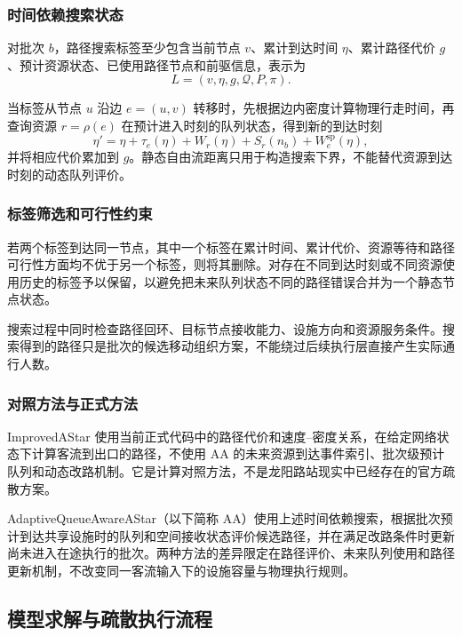 \documentclass[UTF8,a4paper,12pt]{ctexart}
\begin{document}
\subsubsection{时间依赖搜索状态}

对批次 \(b\)，路径搜索标签至少包含当前节点 \(v\)、累计到达时间 \(\eta\)、累计路径代价 \(g\)、预计资源状态、已使用路径节点和前驱信息，表示为
\[
L=(v,\eta,g,\mathcal{Q},P,\pi).
\]

当标签从节点 \(u\) 沿边 \(e=(u,v)\) 转移时，先根据边内密度计算物理行走时间，再查询资源 \(r=\rho(e)\) 在预计进入时刻的队列状态，得到新的到达时刻
\[
\eta'=\eta+\tau_e(\eta)+W_r(\eta)+S_r(n_b)+W^{\mathrm{sp}}_e(\eta),
\]
并将相应代价累加到 \(g\)。静态自由流距离只用于构造搜索下界，不能替代资源到达时刻的动态队列评价。

\subsubsection{标签筛选和可行性约束}

若两个标签到达同一节点，其中一个标签在累计时间、累计代价、资源等待和路径可行性方面均不优于另一个标签，则将其删除。对存在不同到达时刻或不同资源使用历史的标签予以保留，以避免把未来队列状态不同的路径错误合并为一个静态节点状态。

搜索过程中同时检查路径回环、目标节点接收能力、设施方向和资源服务条件。搜索得到的路径只是批次的候选移动组织方案，不能绕过后续执行层直接产生实际通行人数。

\subsubsection{对照方法与正式方法}

ImprovedAStar 使用当前正式代码中的路径代价和速度--密度关系，在给定网络状态下计算客流到出口的路径，不使用 AA 的未来资源到达事件索引、批次级预计队列和动态改路机制。它是计算对照方法，不是龙阳路站现实中已经存在的官方疏散方案。

AdaptiveQueueAwareAStar（以下简称 AA）使用上述时间依赖搜索，根据批次预计到达共享设施时的队列和空间接收状态评价候选路径，并在满足改路条件时更新尚未进入在途执行的批次。两种方法的差异限定在路径评价、未来队列使用和路径更新机制，不改变同一客流输入下的设施容量与物理执行规则。

\subsection{模型求解与疏散执行流程}
\end{document}
